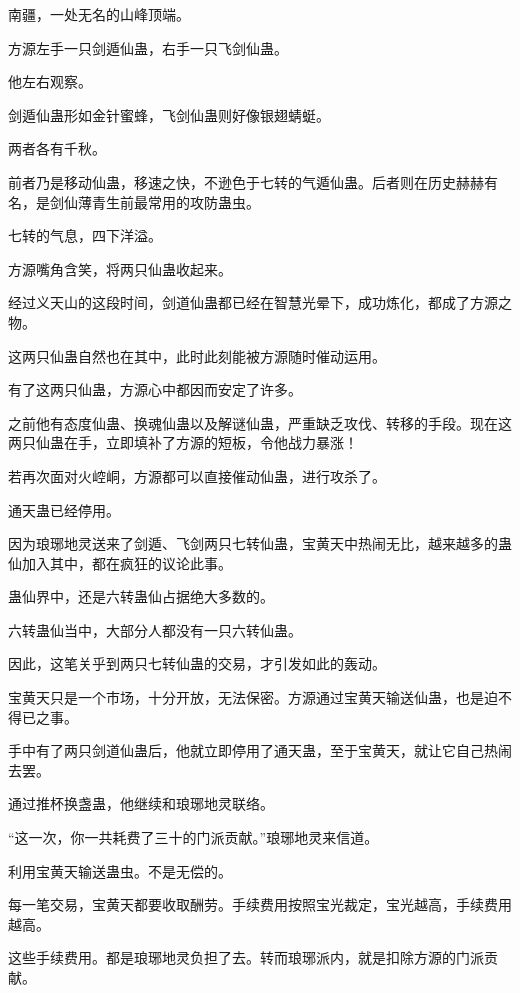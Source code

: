 
\begin{this_body}

南疆，一处无名的山峰顶端。

方源左手一只剑遁仙蛊，右手一只飞剑仙蛊。

他左右观察。

剑遁仙蛊形如金针蜜蜂，飞剑仙蛊则好像银翅蜻蜓。

两者各有千秋。

前者乃是移动仙蛊，移速之快，不逊色于七转的气遁仙蛊。后者则在历史赫赫有名，是剑仙薄青生前最常用的攻防蛊虫。

七转的气息，四下洋溢。

方源嘴角含笑，将两只仙蛊收起来。

经过义天山的这段时间，剑道仙蛊都已经在智慧光晕下，成功炼化，都成了方源之物。

这两只仙蛊自然也在其中，此时此刻能被方源随时催动运用。

有了这两只仙蛊，方源心中都因而安定了许多。

之前他有态度仙蛊、换魂仙蛊以及解谜仙蛊，严重缺乏攻伐、转移的手段。现在这两只仙蛊在手，立即填补了方源的短板，令他战力暴涨！

若再次面对火崆峒，方源都可以直接催动仙蛊，进行攻杀了。

通天蛊已经停用。

因为琅琊地灵送来了剑遁、飞剑两只七转仙蛊，宝黄天中热闹无比，越来越多的蛊仙加入其中，都在疯狂的议论此事。

蛊仙界中，还是六转蛊仙占据绝大多数的。

六转蛊仙当中，大部分人都没有一只六转仙蛊。

因此，这笔关乎到两只七转仙蛊的交易，才引发如此的轰动。

宝黄天只是一个市场，十分开放，无法保密。方源通过宝黄天输送仙蛊，也是迫不得已之事。

手中有了两只剑道仙蛊后，他就立即停用了通天蛊，至于宝黄天，就让它自己热闹去罢。

通过推杯换盏蛊，他继续和琅琊地灵联络。

“这一次，你一共耗费了三十的门派贡献。”琅琊地灵来信道。

利用宝黄天输送蛊虫。不是无偿的。

每一笔交易，宝黄天都要收取酬劳。手续费用按照宝光裁定，宝光越高，手续费用越高。

这些手续费用。都是琅琊地灵负担了去。转而琅琊派内，就是扣除方源的门派贡献。


\end{this_body}
